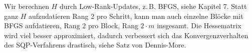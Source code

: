 Wir berechnen $H$ durch Low-Rank-Updates, z.\,B. BFGS, siehe Kapitel 7. Statt ganz $H$ aufzudatieren Rang 2 pro Schritt, kann man auch einzelne Blöcke mit BFGS aufdatieren, Rang 2 pro Block, Rang $2\cdot m$ insgesamt. Die Hessematrix wird viel besser approximiert, dadurch verbessert sich das Konvergenzverhalten des SQP-Verfahrens drastisch, siehe Satz von Dennis-More.



























